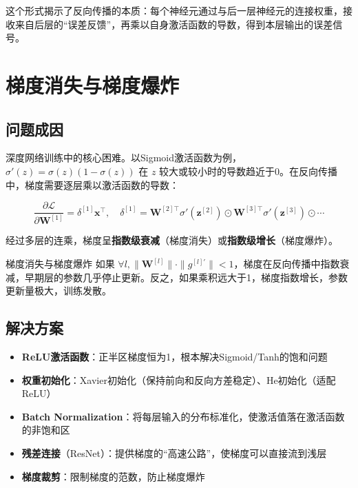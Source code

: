这个形式揭示了反向传播的本质：每个神经元通过与后一层神经元的连接权重，接收来自后层的``误差反馈''，再乘以自身激活函数的导数，得到本层输出的误差信号。

\section{梯度消失与梯度爆炸}

\subsection{问题成因}

深度网络训练中的核心困难。以Sigmoid激活函数为例，$\sigma'(z) = \sigma(z)(1-\sigma(z))$ 在 $z$ 较大或较小时的导数趋近于0。在反向传播中，梯度需要逐层乘以激活函数的导数：

\[
\frac{\partial\mathcal{L}}{\partial\mathbf{W}^{[1]}} = \delta^{[1]}\mathbf{x}^{\top}, \quad
\delta^{[1]} = \mathbf{W}^{[2]\top}\sigma'(\mathbf{z}^{[2]})\odot\mathbf{W}^{[3]\top}\sigma'(\mathbf{z}^{[3]})\odot\cdots
\]

经过多层的连乘，梯度呈\textbf{指数级衰减}（梯度消失）或\textbf{指数级增长}（梯度爆炸）。

\begin{mydefinition}{梯度消失与梯度爆炸}
如果 $\forall l, \|\mathbf{W}^{[l]}\| \cdot \|g^{[l]\prime}\| < 1$，梯度在反向传播中指数衰减，早期层的参数几乎停止更新。反之，如果乘积远大于1，梯度指数增长，参数更新量极大，训练发散。
\end{mydefinition}

\subsection{解决方案}

\begin{itemize}
    \item \textbf{ReLU激活函数}：正半区梯度恒为1，根本解决Sigmoid/Tanh的饱和问题
    \item \textbf{权重初始化}：Xavier初始化（保持前向和反向方差稳定）、He初始化（适配ReLU）
    \item \textbf{Batch Normalization}：将每层输入的分布标准化，使激活值落在激活函数的非饱和区
    \item \textbf{残差连接}（ResNet）：提供梯度的``高速公路''，使梯度可以直接流到浅层
    \item \textbf{梯度裁剪}：限制梯度的范数，防止梯度爆炸
\end{itemize}

